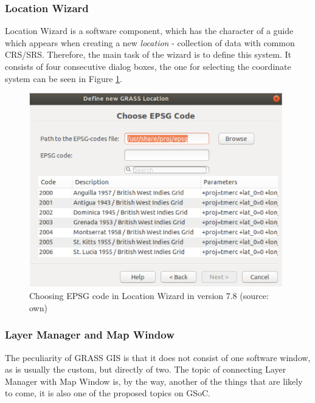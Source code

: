 \documentclass[a4paper,10pt,twoside]{article}
\begin{document}
\subsubsection{Location Wizard}
\label{subsection:wizard}
\noindent
\large
Location Wizard is a software component, which has the character of a guide which appears when creating a new \textit{location} - collection of data with common CRS/SRS. Therefore, the main task of the wizard is to define this system. It consists of four consecutive dialog boxes, the one for selecting the coordinate system can be seen in Figure \ref{fig:loc_wizard_sour_pred}.

\vspace{0.3cm}
\begin{figure}[hbt!]
\begin{center}
\includegraphics[width=11cm]{../pictures/loc_wizard_sour_pred.png} 
\caption[Choosing EPSG code in Location Wizard in version 7.8]{Choosing EPSG code in Location Wizard in version 7.8 (source: own)}
\label{fig:loc_wizard_sour_pred}
\end{center}
\end{figure}

\newpage
\vspace*{-1cm}
\subsubsection{Layer Manager and Map Window}

\noindent The peculiarity of GRASS GIS is that it does not consist of one software window, as is usually the custom, but directly of two. The topic of connecting Layer Manager with Map Window is, by the way, another of the things that are likely to come, it is also one of the proposed topics on GSoC.
\end{document}
